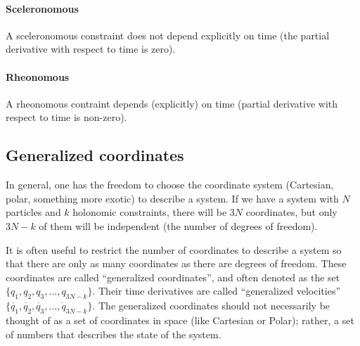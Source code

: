 \paragraph{Sceleronomous}
A sceleronomous constraint does not depend explicitly on time (the partial derivative with respect to time is zero).
\paragraph{Rheonomous}
A rheonomous contraint depends (explicitly) on time (partial derivative with respect to time is non-zero).

\subsection{Generalized coordinates}
In general, one has the freedom to choose the coordinate system (Cartesian, polar, something more exotic) to describe a system. If we have a system with $N$ particles and $k$ holonomic constraints, there will be $3N$ coordinates, but only $3N-k$ of them will be independent (the number of degrees of freedom). 

It is often useful to restrict the number of coordinates to describe a system so that there are only as many coordinates as there are degrees of freedom. These coordinates are called ``generalized coordinates'', and often denoted as the set  $\{q_1,q_2,q_3,\dots,q_{3N-k}\}$. Their time derivatives are called ``generalized velocities'' $\{\dot{q_1},\dot{q_2},\dot{q_3},\dots,\dot{q}_{3N-k}\}$. The generalized coordinates should not necessarily be thought of as a set of coordinates in space (like Cartesian or Polar); rather, a set of numbers that describes the state of the system. 

